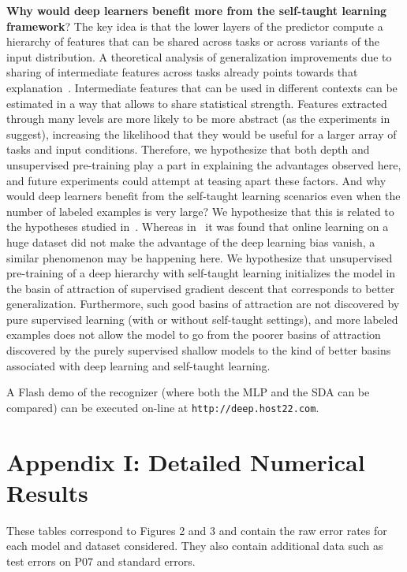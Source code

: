 \documentclass[smallcondensed]{svjour3}     %
\begin{document}
{\bf Why would deep learners benefit more from the self-taught learning framework}?
The key idea is that the lower layers of the predictor compute a hierarchy
of features that can be shared across tasks or across variants of the
input distribution. A theoretical analysis of generalization improvements
due to sharing of intermediate features across tasks already points
towards that explanation~\cite{baxter95a}.
Intermediate features that can be used in different
contexts can be estimated in a way that allows to share statistical 
strength. Features extracted through many levels are more likely to
be more abstract (as the experiments in~\citet{Goodfellow2009} suggest),
increasing the likelihood that they would be useful for a larger array
of tasks and input conditions.
Therefore, we hypothesize that both depth and unsupervised
pre-training play a part in explaining the advantages observed here, and future
experiments could attempt at teasing apart these factors.
And why would deep learners benefit from the self-taught learning
scenarios even when the number of labeled examples is very large?
We hypothesize that this is related to the hypotheses studied
in~\citet{Erhan+al-2010}. Whereas in~\citet{Erhan+al-2010}
it was found that online learning on a huge dataset did not make the
advantage of the deep learning bias vanish, a similar phenomenon
may be happening here. We hypothesize that unsupervised pre-training
of a deep hierarchy with self-taught learning initializes the
model in the basin of attraction of supervised gradient descent
that corresponds to better generalization. Furthermore, such good
basins of attraction are not discovered by pure supervised learning
(with or without self-taught settings), and more labeled examples
does not allow the model to go from the poorer basins of attraction discovered
by the purely supervised shallow models to the kind of better basins associated
with deep learning and self-taught learning.
 
A Flash demo of the recognizer (where both the MLP and the SDA can be compared) 
can be executed on-line at {\tt http://deep.host22.com}.


\section*{Appendix I: Detailed Numerical Results}

These tables correspond to Figures 2 and 3 and contain the raw error rates for each model and dataset considered.
They also contain additional data such as test errors on P07 and standard errors.
\end{document}
